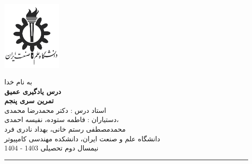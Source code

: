 \begin{minipage}{0.1\textwidth}
\includegraphics[width=3cm]{etc/IUST}
\end{minipage}%
\hfill%
\begin{minipage}{0.6\textwidth}\centering
\fontsize{13pt}{13pt}\selectfont
به‌ نام خدا \\
\textbf{درس یادگیری عمیق} \\
\textbf{تمرین سری پنجم}\\
استاد درس : دکتر محمدرضا محمدی \\
دستیاران :  فاطمه ستوده، نفیسه احمدی،\\ محمدمصطفی رستم خانی، بهداد نادری فرد
\\
\vspace{0.25cm}
\begingroup
\fontsize{11pt}{11pt}\selectfont
دانشگاه علم و صنعت ایران، دانشکده مهندسی کامپیوتر \\
نیمسال دوم تحصیلی 1403 - 1404 \\
\endgroup
\end{minipage}%
\hfill%
\begin{minipage}{0.1\textwidth}

\end{minipage}

\vspace{0.5cm}

\noindent\rule{\textwidth}{1pt}